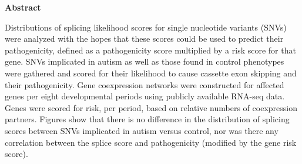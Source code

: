 \thispagestyle{plain}
\begin{center}
    \textbf{Abstract}
\end{center}
Distributions of splicing likelihood scores for single nucleotide variants 
(SNVs) were analyzed with the hopes that these scores could be used to 
predict their pathogenicity, defined as a pathogenicity score multiplied by a 
risk score for that gene. SNVs implicated in autism as well as those found in
control phenotypes were gathered and scored for their likelihood to cause 
cassette exon skipping and their pathogenicity. Gene coexpression networks
were constructed for affected genes per eight developmental periods using
publicly available RNA-seq data. Genes were scored for risk, per period, 
based on relative numbers of coexpression partners. Figures show that there is
no difference in the distribution of splicing scores between SNVs implicated
in autism versus control, nor was there any correlation between the splice
score and pathogenicity (modified by the gene risk score).
